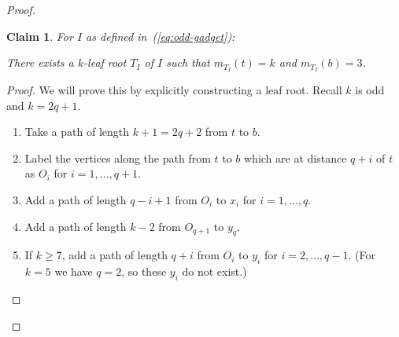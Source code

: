\documentclass[11pt,letter]{article}
\newtheorem{claim}[theorem]{Claim}
\theoremstyle{remark}
\begin{document}
\begin{proof}
    \begin{claim}\label{cl:induction-odd-Top-2}
        For $I$ as defined in~(\ref{eq:odd-gadget}):
        
        There exists a $k$-leaf root $T_I$ of $I$ such that $m_{T_I}(t)=k$ and $m_{T_I}(b)=3$.
    \end{claim}

    \begin{proof}
        We will prove this by explicitly constructing a leaf root. Recall $k$ is odd and $k=2q+1$.     
        \begin{enumerate}
            \item Take a path of length $k+1=2q+2$ from $t$ to $b$. 
            
            \item Label the vertices along the path from $t$ to $b$ which are at distance $q+i$ of $t$ as $O_i$  for $i=1,\dots, q+1$.

            \item Add a path of length $q-i+1$ from $O_i$ to $x_i$ for $i=1,\dots,q$.

            \item Add a path of length $k-2$ from $O_{q+1}$ to $y_q$.

            \item If $k\geq 7$, add a path of length $q+i$ from $O_i$ to $y_i$ for $i=2,\dots, q-1$. (For $k=5$ we have $q=2$, so these $y_i$ do not exist.) 


        \end{enumerate} 
        \begin{figure}[h!]
        \centering
\end{figure}
\end{proof}
\end{proof}
\end{document}
